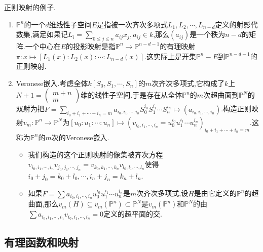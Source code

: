 正则映射的例子.
\begin{enumerate}
	\item $\mathbb{P}^n$的一个$d$维线性子空间$E$是指被一次齐次多项式$L_1,L_2,\cdots,L_{n-d}$定义的射影代数集,满足如果记$L_i=\sum_{0\le j\le n}a_{ij}x_j,a_{ij}\in k$,那么$\left(a_{ij}\right)$是一个秩为$n-d$的矩阵.一个中心在$E$的投影映射是指$\mathbb{P}^n\to\mathbb{P}^{n-d-1}$的有理映射$\pi:x\mapsto[L_1(x):L_2(x):\cdots:L_{n-d}(x)]$.这实际上是开集$\mathbb{P}^n-E$到$\mathbb{P}^{n-d-1}$的正则映射.
	\item Veronese嵌入.考虑全体$k[S_0,S_1,\cdots,S_n]$的$m$次齐次多项式,它构成了$k$上$N+1=\left(\begin{array}{cc}m+n\\m\end{array}\right)$维的线性子空间.于是存在从全体$\mathbb{P}^n$的$m$次超曲面到$\mathbb{P}^N$的双射为把$F=\sum_{i_0+i_1+\cdots+i_n=m}a_{i_0,i_1,\cdots,i_n}S_0^{i_0}S_1^{i_1}\cdots S_n^{i_n}\mapsto(a_{i_0,i_1,\cdots,i_n})$.构造正则映射$v_m:\mathbb{P}^n\to\mathbb{P}^N$为$[u_0:u_1:\cdots:u_n]\mapsto(v_{i_0,i_1,\cdots,i_n}=u_0^{i_0}u_1^{i_1}\cdots u_n^{i_n})_{i_0+i_1+\cdots+i_n=m}$.这称为$\mathbb{P}^n$的$m$次的Veronese嵌入.
	\begin{itemize}
		\item 我们构造的这个正则映射的像集被齐次方程$v_{i_0,i_1,\cdots,i_n}v_{j_0,j_1,\cdots,j_n}=v_{k_0,k_1,\cdots,k_n}v_{l_0,l_1,\cdots,l_n}$使得$i_0+j_0=k_0+l_0,\cdots,i_n+j_n=k_n+l_n$.
		\item 如果$F=\sum a_{i_0,i_1,\cdots,i_n}u_0^{i_0}u_1^{i_1}\cdots u_n^{i_n}$是$m$次齐次多项式,设$H$是由它定义的$\mathbb{P}^n$的超曲面,那么$v_m(H)\subseteq v_m(\mathbb{P}^n)\subset\mathbb{P}^N$是$v_m(\mathbb{P}^n)$和$\mathbb{P}^N$的由$\sum a_{i_0,i_1,\cdots,i_n}v_{i_0,i_1,\cdots,i_n}=0$定义的超平面的交.
	\end{itemize}
\end{enumerate}
\subsection{有理函数和映射}


